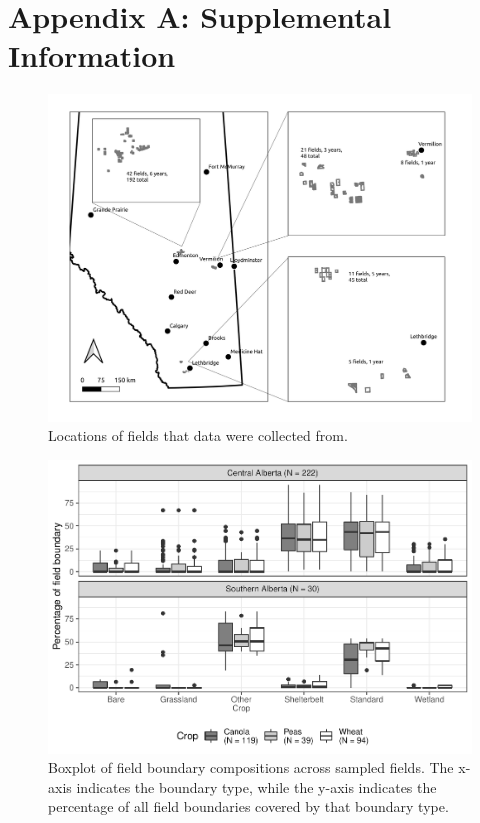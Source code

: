 \documentclass[]{elsarticle} %
\begin{document}
\hypertarget{appendix-a-supplemental-information}{%
\section*{Appendix A: Supplemental Information}\label{appendix-a-supplemental-information}}

\setcounter{table}{0} \renewcommand{\thetable}{S\arabic{table}} \setcounter{figure}{0} \renewcommand{\thefigure}{S\arabic{figure}}

\begin{figure}
\includegraphics[width=1\linewidth]{Field Locations} \caption{Locations of fields that data were collected from.}
\end{figure}

\begin{figure}
\includegraphics[width=1\linewidth]{boundaryTypes-1} \caption{Boxplot of field boundary compositions across sampled fields. The x-axis indicates the boundary type, while the y-axis indicates the percentage of all field boundaries covered by that boundary type.}
\end{figure}
\end{document}
